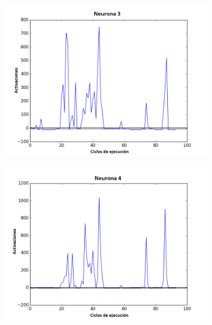 \begin{figure}[!h]
\begin{subfigure}{0.33\textwidth}
  \includegraphics[width=\linewidth]{Imagenes/Agente2Activaciones/Agente3/Neurona2}
\end{subfigure}
\medskip
\begin{subfigure}{0.33\textwidth}
  \includegraphics[width=\linewidth]{Imagenes/Agente2Activaciones/Agente3/Neurona3}
\end{subfigure}\hfil %
\begin{subfigure}{0.33\textwidth}

\end{subfigure}
\end{figure}
